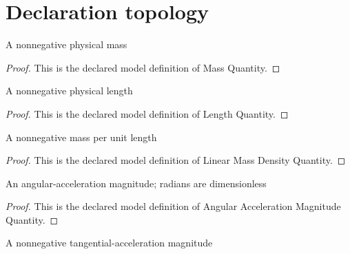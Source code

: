 \section{Declaration topology}
\begin{definition}
  \label{def:physics:phyx-mini-0697:phyxminiproblems-problemphyxmini0697-massquantity}
  A nonnegative physical mass
\end{definition}
\begin{proof}
  This is the declared model definition of Mass Quantity.
\end{proof}
\begin{definition}
  \label{def:physics:phyx-mini-0697:phyxminiproblems-problemphyxmini0697-lengthquantity}
  A nonnegative physical length
\end{definition}
\begin{proof}
  This is the declared model definition of Length Quantity.
\end{proof}
\begin{definition}
  \label{def:physics:phyx-mini-0697:phyxminiproblems-problemphyxmini0697-linearmassdensityquantity}
  A nonnegative mass per unit length
\end{definition}
\begin{proof}
  This is the declared model definition of Linear Mass Density Quantity.
\end{proof}
\begin{definition}
  \label{def:physics:phyx-mini-0697:phyxminiproblems-problemphyxmini0697-angularaccelerationmagnitudequantity}
  An angular-acceleration magnitude; radians are dimensionless
\end{definition}
\begin{proof}
  This is the declared model definition of Angular Acceleration Magnitude Quantity.
\end{proof}
\begin{definition}
  \label{def:physics:phyx-mini-0697:phyxminiproblems-problemphyxmini0697-accelerationmagnitudequantity}
  A nonnegative tangential-acceleration magnitude
\end{definition}
